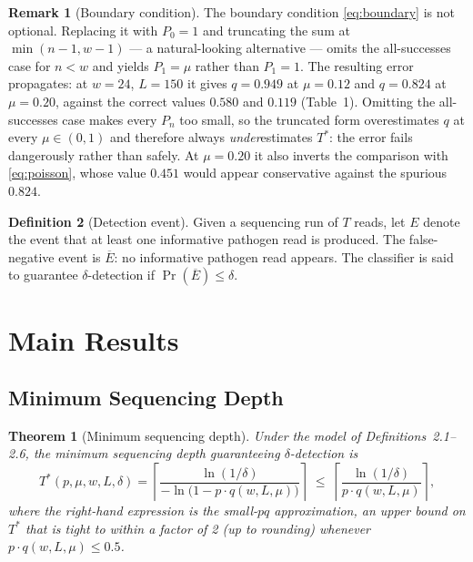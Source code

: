 \documentclass[12pt]{article}
\theoremstyle{definition}
\newtheorem{definition}{Definition}[section]
\newtheorem{remark}[definition]{Remark}
\theoremstyle{plain}
\newtheorem{theorem}{Theorem}[section]
\begin{document}
\begin{remark}[Boundary condition]\label{rem:boundary}
The boundary condition \eqref{eq:boundary} is not optional. Replacing it
with $P_0=1$ and truncating the sum at $\min(n-1,w-1)$ --- a natural-looking
alternative --- omits the all-successes case for $n<w$ and yields
$P_1=\mu$ rather than $P_1=1$. The resulting error propagates: at $w=24$,
$L=150$ it gives $q=0.949$ at $\mu=0.12$ and $q=0.824$ at $\mu=0.20$,
against the correct values $0.580$ and $0.119$ (Table~1). Omitting the
all-successes case makes every $P_n$ too small, so the truncated form
overestimates $q$ at every $\mu\in(0,1)$ and therefore always
\emph{under}estimates $T^{*}$: the error fails dangerously rather than
safely. At $\mu=0.20$ it also inverts the comparison with
\eqref{eq:poisson}, whose value $0.451$ would appear conservative against
the spurious $0.824$.
\end{remark}

\begin{definition}[Detection event]\label{def:detection}
Given a sequencing run of $T$ reads, let $E$ denote the event that at least
one informative pathogen read is produced. The false-negative event is
$\overline{E}$: no informative pathogen read appears. The classifier is said
to guarantee $\delta$-detection if $\Pr(\overline{E})\le\delta$.
\end{definition}

\section{Main Results}

\subsection{Minimum Sequencing Depth}

\begin{theorem}[Minimum sequencing depth]\label{thm:depth}
Under the model of Definitions~2.1--2.6, the minimum sequencing depth
guaranteeing $\delta$-detection is
\begin{equation}\label{eq:tstar}
  T^{*}(p,\mu,w,L,\delta)=\left\lceil\frac{\ln(1/\delta)}{-\ln\bigl(1-p\cdot q(w,L,\mu)\bigr)}\right\rceil
  \;\le\;\left\lceil\frac{\ln(1/\delta)}{p\cdot q(w,L,\mu)}\right\rceil,
\end{equation}
where the right-hand expression is the small-$pq$ approximation, an upper
bound on $T^{*}$ that is tight to within a factor of 2 (up to rounding)
whenever $p\cdot q(w,L,\mu)\le 0.5$.
\end{theorem}
\end{document}

